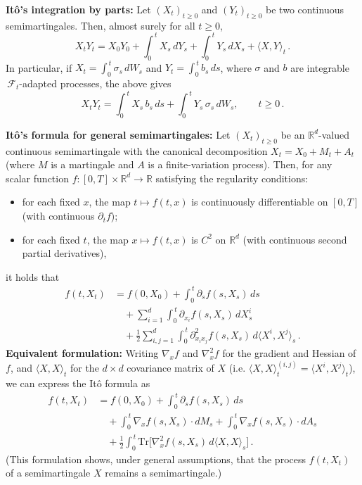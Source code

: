 \documentclass[12pt]{article}
\numberwithin{equation}{section}
\theoremstyle{remark}
\begin{document}
\noindent \textbf{Itô’s integration by parts:} Let $(X_t)_{t\ge0}$ and $(Y_t)_{t\ge0}$ be two continuous semimartingales. Then, almost surely for all $t \ge 0$, 
\[ 
X_t Y_t = X_0 Y_0 + \int_{0}^{\,t} X_s\,dY_s + \int_{0}^{\,t} Y_s\,dX_s + \langle X, Y \rangle_t\,. 
\] 
In particular, if $X_t = \int_{0}^{\,t} \sigma_s\,dW_s$ and $Y_t = \int_{0}^{\,t} b_s\,ds$, where $\sigma$ and $b$ are integrable $\,\mathcal{F}_t$-adapted processes, the above gives 
\[ 
X_t Y_t = \int_{0}^{\,t} X_s\,b_s\,ds + \int_{0}^{\,t} Y_s\,\sigma_s\,dW_s, \qquad t \ge 0\,.
\] 

\noindent \textbf{Itô’s formula for general semimartingales:} Let $(X_t)_{t\ge0}$ be an $\mathbb{R}^d$-valued continuous semimartingale with the canonical decomposition $X_t = X_0 + M_t + A_t$ (where $M$ is a martingale and $A$ is a finite-variation process). Then, for any scalar function $f: [0,T]\times\mathbb{R}^d \to \mathbb{R}$ satisfying the regularity conditions: 
\begin{itemize}
\item for each fixed $x$, the map $t \mapsto f(t,x)$ is continuously differentiable on $[0,T]$ (with continuous $\partial_t f$); 
\item for each fixed $t$, the map $x \mapsto f(t,x)$ is $C^2$ on $\mathbb{R}^d$ (with continuous second partial derivatives), 
\end{itemize}
it holds that 
\[
\begin{aligned}
f(t,X_t) &= f(0,X_0) + \int_{0}^{\,t} \partial_s f(s, X_s)\,ds \\
&\quad + \sum_{i=1}^d \int_{0}^{\,t} \partial_{x_i} f(s,X_s)\,dX_s^i \\
&\quad + \frac{1}{2}\sum_{i,j=1}^d \int_{0}^{\,t} \partial^2_{x_i x_j} f(s,X_s)\,d\langle X^i, X^j \rangle_s\,.
\end{aligned}
\] 
\noindent \textbf{Equivalent formulation:} Writing $\nabla_x f$ and $\nabla_x^2 f$ for the gradient and Hessian of $f$, and $\langle X, X \rangle_t$ for the $d\times d$ covariance matrix of $X$ (i.e. $\langle X,X\rangle_t^{(i,j)} = \langle X^i, X^j\rangle_t$), we can express the Itô formula as 
\[
\begin{aligned}
f(t,X_t) &= f(0,X_0) + \int_{0}^{\,t} \partial_s f(s,X_s)\,ds \\
&\quad + \int_{0}^{\,t} \nabla_x f(s,X_s)\cdot dM_s + \int_{0}^{\,t} \nabla_x f(s,X_s)\cdot dA_s \\
&\quad + \frac{1}{2} \int_{0}^{\,t} \text{Tr}\!\Big[\nabla_x^2 f(s,X_s)\,d\langle X,X\rangle_s\Big]\,.
\end{aligned}
\] 
(This formulation shows, under general assumptions, that the process $f(t, X_t)$ of a semimartingale $X$ remains a semimartingale.)

\vfill

\printbibliography

\nocite{Hottovy2015}
\end{document}
